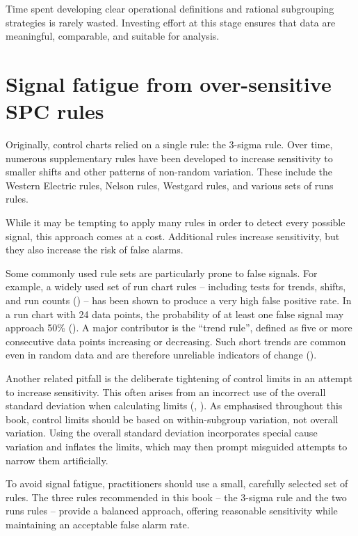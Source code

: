 \documentclass[
]{book}
\begin{document}
Time spent developing clear operational definitions and rational subgrouping strategies is rarely wasted. Investing effort at this stage ensures that data are meaningful, comparable, and suitable for analysis.

\section{Signal fatigue from over-sensitive SPC rules}\label{signal-fatigue-from-over-sensitive-spc-rules}

Originally, control charts relied on a single rule: the 3-sigma rule. Over time, numerous supplementary rules have been developed to increase sensitivity to smaller shifts and other patterns of non-random variation. These include the Western Electric rules, Nelson rules, Westgard rules, and various sets of runs rules.

While it may be tempting to apply many rules in order to detect every possible signal, this approach comes at a cost. Additional rules increase sensitivity, but they also increase the risk of false alarms.

Some commonly used rule sets are particularly prone to false signals. For example, a widely used set of run chart rules -- including tests for trends, shifts, and run counts () -- has been shown to produce a very high false positive rate. In a run chart with 24 data points, the probability of at least one false signal may approach 50\% (). A major contributor is the ``trend rule'', defined as five or more consecutive data points increasing or decreasing. Such short trends are common even in random data and are therefore unreliable indicators of change ().

Another related pitfall is the deliberate tightening of control limits in an attempt to increase sensitivity. This often arises from an incorrect use of the overall standard deviation when calculating limits (, ). As emphasised throughout this book, control limits should be based on within-subgroup variation, not overall variation. Using the overall standard deviation incorporates special cause variation and inflates the limits, which may then prompt misguided attempts to narrow them artificially.

To avoid signal fatigue, practitioners should use a small, carefully selected set of rules. The three rules recommended in this book -- the 3-sigma rule and the two runs rules -- provide a balanced approach, offering reasonable sensitivity while maintaining an acceptable false alarm rate.
\end{document}
